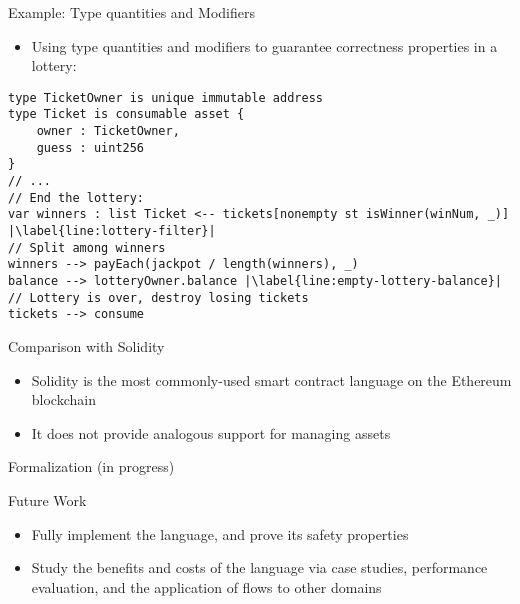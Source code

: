 \documentclass[leqno,presentation,usenames,dvipsnames]{beamer}
\begin{document}
\begin{frame}[fragile]{Example: Type quantities and Modifiers}
    \begin{itemize}
        \item Using type quantities and modifiers to guarantee correctness properties in a lottery:
    \end{itemize}
\begin{lstlisting}[language=flow, xleftmargin=-0.2em, basicstyle=\scriptsize\ttfamily]
type TicketOwner is unique immutable address
type Ticket is consumable asset {
    owner : TicketOwner,
    guess : uint256
}
// ...
// End the lottery:
var winners : list Ticket <-- tickets[nonempty st isWinner(winNum, _)] |\label{line:lottery-filter}|
// Split among winners
winners --> payEach(jackpot / length(winners), _)
balance --> lotteryOwner.balance |\label{line:empty-lottery-balance}|
// Lottery is over, destroy losing tickets
tickets --> consume
\end{lstlisting}
\end{frame}

\begin{frame}[fragile]{Comparison with Solidity}
    \begin{itemize}
        \item Solidity is the most commonly-used smart contract language on the Ethereum blockchain
        \item It does not provide analogous support for managing assets
    \end{itemize}



\end{frame}

\begin{frame}{Formalization (in progress)}
\end{frame}

\begin{frame}{Future Work}
    \begin{itemize}
        \item Fully implement the \langName language, and prove its safety properties
        \item Study the benefits and costs of the language via case studies, performance evaluation, and the application of flows to other domains
    \end{itemize}
\end{frame}
\end{document}
